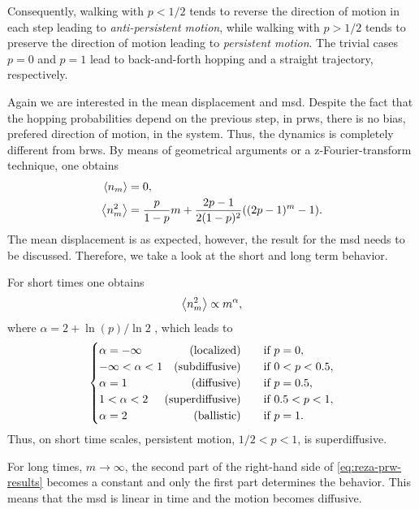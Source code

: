 Consequently, walking with $p < 1/2$ tends to reverse the direction of motion in each step leading to \textit{anti-persistent motion}, while walking with $p > 1/2$ tends to preserve the direction of motion leading to \textit{persistent motion}. The trivial cases $p=0$ and $p=1$ lead to back-and-forth hopping and a straight trajectory, respectively.

Again we are interested in the mean displacement and \ac{msd}. Despite the fact that the hopping probabilities depend on the previous step, in \acp{prw}, there is no bias, \ie prefered direction of motion, in the system. Thus, the dynamics is completely different from \acp{brw}. By means of geometrical arguments or a z-Fourier-transform technique, one obtains \cite{shaebani:2014}
\begin{equation}\label{eq:reza-prw-results}
 \begin{aligned}
  \left<n_m\right> &= 0,
  \\
  \left<n^2_m\right> &= \frac{p}{1-p}m+\frac{2p-1}{2(1-p)^2}((2p-1)^m-1).
 \end{aligned}
\end{equation}
The mean displacement is as expected, however, the result for the \ac{msd} needs to be discussed. Therefore, we take a look at the short and long term behavior.

For short times one obtains
\begin{equation*}
 \left<n^2_m\right> \propto m^\alpha,
\end{equation*}
where $\alpha = 2 + \ln{(p)} / \ln{2}$ \cite{shaebani:2014}, which leads to
\begin{equation*}
 \begin{cases}
  \alpha = -\infty \quad \hfill \textrm{(localized)} & \quad \textrm{if } p=0, \\
  -\infty < \alpha < 1 \quad \hfill \textrm{(subdiffusive)} & \quad \textrm{if } 0<p<0.5, \\
  \alpha = 1 \quad \hfill \textrm{(diffusive)} & \quad \textrm{if } p=0.5, \\
  1 < \alpha < 2 \quad \hfill \textrm{(superdiffusive)} & \quad \textrm{if } 0.5<p<1, \\
  \alpha = 2 \quad \hfill \textrm{(ballistic)} & \quad \textrm{if } p=1.
 \end{cases}
\end{equation*}
Thus, on short time scales, persistent motion, \ie $1/2 < p < 1$, is superdiffusive.

For long times, \ie $m \rightarrow \infty$, the second part of the right-hand side of \autoref{eq:reza-prw-results} becomes a constant and only the first part determines the behavior. This means that the \ac{msd} is linear in time and the motion becomes diffusive.

